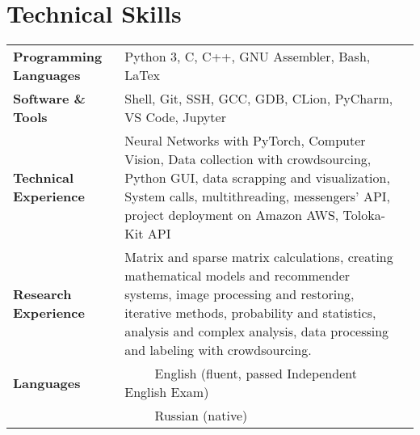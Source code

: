 \documentclass[11pt, a4paper]{article}
\begin{document}
\section*{Technical Skills}
\begin{tabular}{ l p{12cm}l }
    \textbf{Programming Languages} & Python 3, C, C++, GNU Assembler, Bash, LaTex \\ [0.8ex]
    \textbf{Software \& Tools} & Shell, Git, SSH, GCC, GDB, CLion, PyCharm, VS Code, Jupyter \\ [0.8ex]
    \textbf{Technical Experience} & Neural Networks with PyTorch, Computer Vision, Data collection with crowdsourcing, Python GUI, 
    data scrapping and visualization, System calls, multithreading, messengers' API, 
    project deployment on Amazon AWS, Toloka-Kit API \\ [0.8ex]
    \textbf{Research Experience} & Matrix and sparse matrix calculations, creating mathematical models and recommender systems, 
    image processing and restoring, iterative methods, probability and statistics, analysis and complex analysis, data processing and labeling with crowdsourcing. \\ [0.8ex]
    \textbf{Languages} & ~~\llap{\textbullet}~~ English (fluent, passed Independent English Exam) \\
    & ~~\llap{\textbullet}~~ Russian (native)
\end{tabular}
\end{document}
